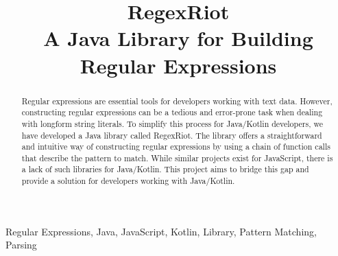 \documentclass[conference]{IEEEtran}
\begin{document}
\title{RegexRiot \\A Java Library for Building Regular Expressions}

\author{
    \and
    \and

}


\maketitle

\begin{abstract}
    Regular expressions are essential tools for developers working with text data.
    However, constructing regular expressions can be a tedious and error-prone task when dealing with longform string literals.
    To simplify this process for Java/Kotlin developers, we have developed a Java library called RegexRiot.
    The library offers a straightforward and intuitive way of constructing regular expressions by using a chain of
    function calls that describe the pattern to match.
    While similar projects exist for JavaScript, there is a lack of such libraries for Java/Kotlin.
    This project aims to bridge this gap and provide a solution for developers working with Java/Kotlin.
\end{abstract}

\begin{IEEEkeywords}
    Regular Expressions, Java, JavaScript, Kotlin, Library, Pattern Matching, Parsing
\end{IEEEkeywords}
\end{document}
